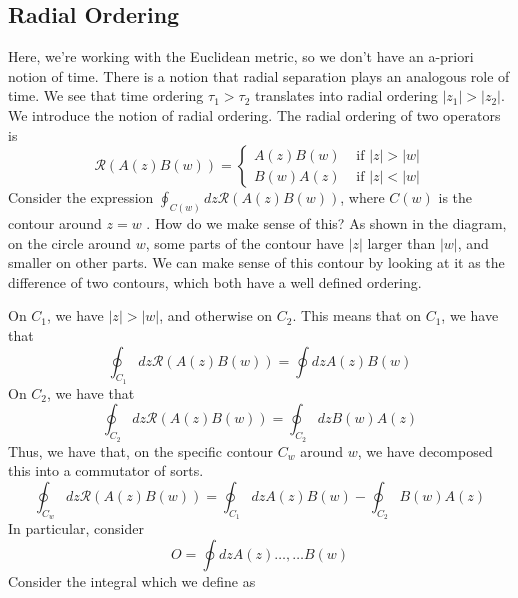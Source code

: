 \documentclass[11pt, oneside]{article}   	%
\theoremstyle{slanted}
\begin{document}
 \subsection{Radial Ordering}
 Here, we're 
 working with the Euclidean metric, 
 so we don't have an a-priori notion of 
 time. There is  a
 notion that radial separation plays 
 an analogous role of time. 
We see that time ordering 
$ \tau _ 1 > \tau _ 2 $ translates into radial 
ordering $ | z _ 1 | > | z _ 2 |  $. We introduce the
notion of radial ordering. 
The radial ordering of 
two operators 
is 
\[
	\mathcal{ R } \left( A \left(  z \right)  B \left(  
	w\right)  \right)
	 = \begin{cases}
		 A \left(  z  \right)  B ( w) &  \text{ if  } | z | > | w | \\
		 B \left(  w  \right)  A \left(   z \right)  & 
		 \text{ if  } | z | < | w| 
	 \end{cases}
\] Consider 
the expression $ \oint_{ C \left( w \right) } 
dz \mathcal{ R } \left( A \left( z  \right)  B \left(  w  \right)   \right)  $, 
where $ C \left( w  \right)  $ is the contour 
around $ z  =w $ . 
How do we make sense of this? As 
shown in the diagram, on the circle around 
$ w  $, some parts of the contour 
have $ | z |  $ larger than $ | w | $, 
and smaller on other parts. We can 
make sense of this contour 
by looking at it 
as the difference of two contours, 
which both have a well defined 
ordering.
\begin{figure}[htpb]
	\centering
	
	\caption{}%
	\label{fig:}
\end{figure}
On $ C _ 1 $, we have $  | z | > | w |  $, 
and otherwise on $ C_ 2 $. 
This means that on $ C _ 1 $, we have 
that 
\[
	\oint_{ C _ 1 } dz \mathcal{ R } \left( 
	A \left(  z \right)  B \left(  w  \right)  \right)  
	= \oint dz A \left(  z \right)  B \left(  w  \right) 
\] On $ C _ 2 $, we have that 
\[
	\oint_{ C _  2} dz \mathcal{ R } \left( 
	A \left( z  \right)  B \left(  w  \right)  \right)  
	= \oint _{ C _ 2 } dz B \left(  w  \right)  A \left(  z  \right) 
\] Thus, we have that, on the 
specific contour $ C _ w $ around $ w $, 
we have decomposed this into a commutator of sorts. 
\[
	\oint_{ 
		C_ w } dz \mathcal{ R  } \left( A \left(  z  \right) B 
	\left(  w  \right)  \right)   = 
	\oint_{ C _ 1 } dz A \left( z  \right)  B \left(  w  \right)  
	- \oint_{ C _  2 } B \left(  w  \right)  A 
	\left(  z  \right) 
\] In particular, 
consider 
\[
	O  = \oint dz A \left(  z  \right) \dots , \dots B \left(  w  \right) 
\] Consider 
the integral which we define as 
\end{document}
